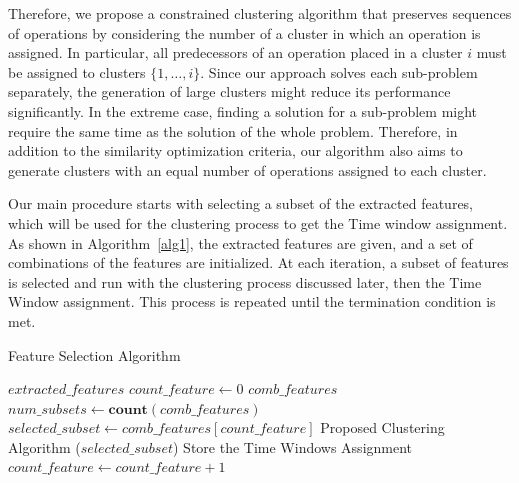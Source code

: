 \documentclass[runningheads]{llncs}
\begin{document}
Therefore, we propose a constrained clustering algorithm that preserves sequences of operations by considering the number of a cluster in which an operation is assigned. In particular, all predecessors of an operation placed in a cluster $i$ must be assigned to clusters $\{1, \dots, i\}$. 
Since our approach solves each sub-problem separately, the generation of large clusters might reduce its performance significantly. In the extreme case, finding a solution for a sub-problem might require the same time as the solution of the whole problem.
Therefore, in addition to the similarity optimization criteria, our algorithm also aims to generate clusters with an equal number of operations assigned to each cluster.  

Our main procedure starts with selecting a subset of the extracted features, which will be used for the clustering process to get the Time window assignment. As shown in Algorithm~\ref{alg1}, the extracted features are given, and a set of combinations of the features are initialized. At each iteration, a subset of features is selected and run with the clustering process discussed later, then the Time Window assignment. This process is repeated until the termination condition is met.

\begin{algorithm}
\caption{Feature Selection Algorithm}\label{alg1}
\begin{algorithmic}
\Require $extracted\_features$
\State $count\_feature \gets 0$
\State $comb\_features$ 
\State $num\_subsets \gets \textbf{count}(comb\_features)$
	\State $selected\_subset \gets comb\_features[count\_feature]$
	\State Proposed Clustering Algorithm ($selected\_subset$)  %
	\State Store the Time Windows Assignment
	\State $count\_feature \gets count\_feature + 1$
\EndWhile

\end{algorithmic}
\end{algorithm}
\end{document}
